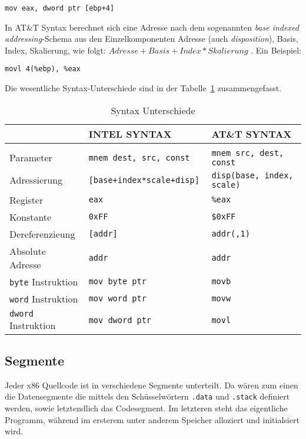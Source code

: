 \hspace{5mm} 
\texttt{mov eax, dword ptr [ebp+4]}

In AT\&T Syntax berechnet sich eine Adresse nach dem sogenannten \emph{base
indexed addressing}-Schema aus den Einzelkomponenten Adresse (auch
\emph{disposition}), Basis, Index, Skalierung, wie folgt: $Adresse + Basis +
Index*Skalierung$ . Ein Beispiel:

\hspace{5mm} 
\texttt{movl 4(\%ebp), \%eax}

Die wesentliche Syntax-Unterschiede sind in der Tabelle~\ref{tab:syntaxdiffs}
zusammengefasst.


\begin{table}[h]	%
\begin{tabular}{lll}
\\	                          & INTEL SYNTAX                  &        AT\&T SYNTAX
\\\hline
\\	Parameter 								& \tt mnem dest, src, const  	  & \tt mnem src, dest, const
\\Adressierung  				    	&	\tt [base+index*scale+disp]   & \tt disp(base, index, scale)
\\	Register      						& \tt eax              					& \tt \%eax
\\	Konstante     						& \tt 0xFF             					& \tt \$0xFF
\\	Dereferenzieung   				& \tt [addr]           					& \tt addr(,1)
\\	Absolute Adresse 			 	  & \tt addr             					& \tt *addr
\\	{\tt byte} Instruktion    & \tt mov byte ptr     					& \tt movb
\\	{\tt word} Instruktion    & \tt mov word ptr     					& \tt movw
\\{\tt dword} Instruktion     & \tt mov dword ptr    					& \tt movl
\end{tabular}
\caption{Syntax Unterschiede} \label{tab:syntaxdiffs}
\end{table}



\subsection{Segmente} Jeder x86 Quellcode ist in verschiedene Segmente
unterteilt. Da wären zum einen die Datensegmente die mittels den
Schüsselwörtern \texttt{.data} und \texttt{.stack} definiert werden, sowie
letztendlich das Codesegment. Im letzteren steht das eigentliche Programm,
während im ersterem unter anderem Speicher alloziert und initialsiert wird.
